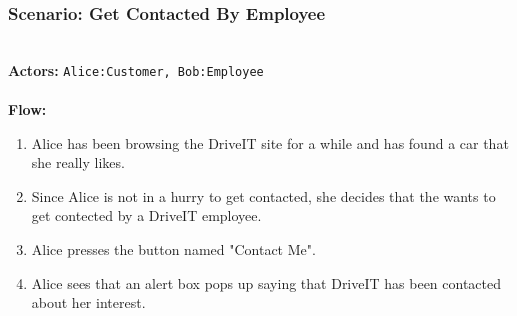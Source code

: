 \subsubsection{Scenario: Get Contacted By Employee}
\HRule \\[0.4cm]
\textbf{Actors:} \texttt{Alice:Customer, Bob:Employee}\\
\HRule \\[0.4cm]
\textbf{Flow:} \\
\begin{enumerate}
    \item Alice has been browsing the DriveIT site for a while and has found a car that she really likes.
    \item Since Alice is not in a hurry to get contacted, she decides that the wants to get contected by a DriveIT employee. 
    \item Alice presses the button named "Contact Me".
    \item Alice sees that an alert box pops up saying that DriveIT has been contacted about her interest.
\end{enumerate}
\HRule \\[0.4cm]
